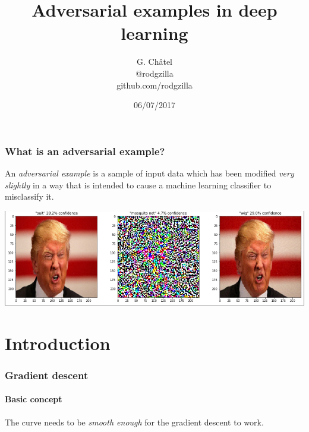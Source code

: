 \documentclass[9pt]{beamer}
\title{Adversarial examples in deep learning}
\author[G. Châtel]{G. Châtel\\@rodgzilla\\github.com/rodgzilla}
\date{06/07/2017}
\begin{document}

\begin{frame}

  \maketitle

\end{frame}

\begin{frame}
  \frametitle{What is an adversarial example?}

  An \emph{adversarial example} is a sample of input data which has
  been modified \emph{very slightly} in a way that is intended to
  cause a machine learning classifier to misclassify it.

  \bigskip

  \pause

  \begin{center}
    \includegraphics[trim={2pt 2pt 2pt 0}, clip, width =
      \linewidth]{images/adversarial_example_wig.png}
  \end{center}

\end{frame}

\section{Introduction}

\begin{frame}
  \frametitle{Gradient descent}

  \framesubtitle{Basic concept}

  \begin{center}
    \scalebox{0.8}{
      
    }
  \end{center}

  The curve needs to be \textit{smooth enough} for the gradient
  descent to work.

\end{frame}
\end{document}
